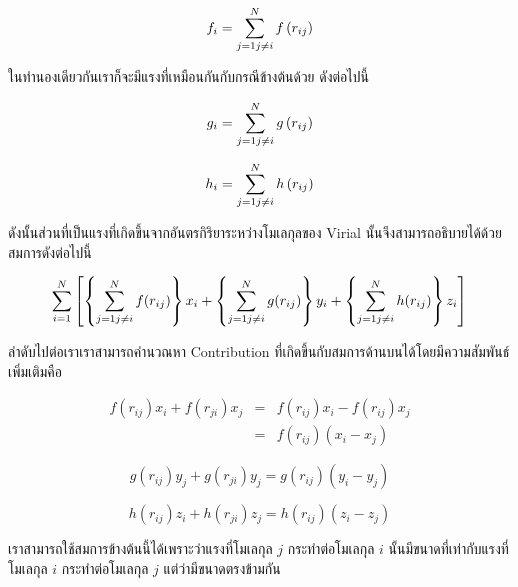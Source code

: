 \begin{equation}
    f_i = \sum_{j=1 \\ j\neq i}^{N} f\left( r_{ij}\right) 
\end{equation}

\noindent ในทำนองเดียวกันเราก็จะมีแรงที่เหมือนกันกับกรณีข้างต้นด้วย ดังต่อไปนี้

\begin{equation}
    g_i = \sum_{j=1 \\ j\neq i}^{N} g\left( r_{ij}\right) 
\end{equation}

\begin{equation}
    h_i = \sum_{j=1 \\ j\neq i}^{N} h\left( r_{ij}\right) 
\end{equation}

ดังนั้นส่วนที่เป็นแรงที่เกิดขึ้นจากอันตรกิริยาระหว่างโมเลกุลของ Virial นั้นจึงสามารถอธิบายได้ด้วยสมการดังต่อไปนี้

\begin{equation}
    \sum_{i=1}^{N} \left[ \left\{ \sum_{j=1 \\ j\neq i}^{N} f(r_{ij})\right\}
    x_i+\left\{ \sum_{j=1 \\ j\neq i}^{N} g(r_{ij})\right\} y_i+\left\{
    \sum_{j=1 \\ j\neq i}^{N} h(r_{ij})\right\} z_i\right] 
\end{equation}

ลำดับไปต่อเราเราสามารถคำนวณหา Contribution ที่เกิดขึ้นกับสมการด้านบนได้โดยมีความสัมพันธ์เพิ่มเติมคือ

\begin{eqnarray}
    f\left(r_{ij}\right) x_i+f\left( r_{ji}\right) x_j & = &f\left( r_{ij}\right)
    x_i-f\left( r_{ij}\right) x_j \\
    & = &f\left( r_{ij}\right) \left( x_i-x_j\right) 
\end{eqnarray}

\begin{equation}
    g\left(r_{ij}\right) y_j+g\left( r_{ji}\right) y_j=g\left( r_{ij}\right)
    \left(y_i-y_j\right) 
\end{equation}

\begin{equation}
    h\left(r_{ij}\right) z_i+h\left( r_{ji}\right) z_j=h\left( r_{ij}\right)
    \left(z_i-z_j\right) 
\end{equation}

เราสามารถใช้สมการข้างต้นนี้ได้เพราะว่าแรงที่โมเลกุล $j$ กระทำต่อโมเลกุล $i$ นั้นมีขนาดที่เท่ากับแรงที่โมเลกุล $i$ กระทำต่อโมเลกุล $j$ 
แต่ว่ามีขนาดตรงข้ามกัน

